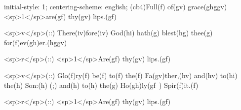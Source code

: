 initial-style: 1;
centering-scheme: english;
(cb4)Full(f) of(gv) grace(ghggv) <sp>1</sp>are(gf) thy(gv) lips.(gf)

<sp>v</sp>(::) There(iv)fore(iv) God(hi) hath(g) blest(hg) thee(g) for(f)ev(gh)er.(hggv)

<sp>r</sp>(::) <sp>1</sp>Are(gf) thy(gv) lips.(gf)

<sp>v</sp>(::) Glo(f)ry(f) be(f) to(f) the(f) Fa(gv)ther,(hv) and(hv) to(hi) the(h) Son:(h) (;) and(h) to(h) the(g) Ho(gh)ly(gf~) Spir(f)it.(f)

<sp>r</sp>(::) <sp>1</sp>Are(gf) thy(gv) lips.(gf)